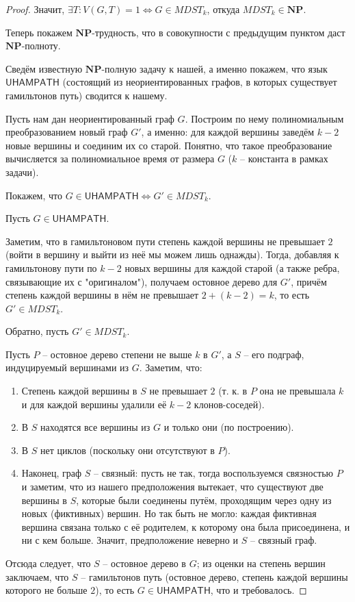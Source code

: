 \documentclass[a4paper,11pt]{article}
\theoremstyle{plain}
\theoremstyle{definition}
\theoremstyle{remark}
\begin{document}
\begin{proof}
Значит, $\exists T: V(G, T) = 1 \Leftrightarrow G \in MDST_k$, откуда $MDST_k \in \mathbf{NP}$.

Теперь покажем $\mathbf{NP}$-трудность, что в совокупности с предыдущим пунктом даст $\mathbf{NP}$-полноту.

Сведём известную $\mathbf{NP}$-полную задачу к нашей, а именно покажем, что язык $\mathsf{UHAMPATH}$ (состоящий из неориентированных графов, в которых существует гамильтонов путь) сводится к нашему.

Пусть нам дан неориентированный граф $G$. Построим по нему полиномиальным преобразованием новый граф $G'$, а именно: для каждой вершины заведём $k-2$ новые вершины и соединим их со старой. Понятно, что такое преобразование вычисляется за полиномиальное время от размера $G$ ($k$ -- константа в рамках задачи).

Покажем, что $G \in \mathsf{UHAMPATH} \Leftrightarrow G' \in MDST_k$.

Пусть $G \in \mathsf{UHAMPATH}$.

Заметим, что в гамильтоновом пути степень каждой вершины не превышает $2$ (войти в вершину и выйти из неё мы можем лишь однажды). Тогда, добавляя к гамильтонову пути по $k-2$ новых вершины для каждой старой (а также ребра, связывающие их с "оригиналом"), получаем остовное дерево для $G'$, причём степень каждой вершины в нём не превышает $2 + (k-2) = k$, то есть $G' \in MDST_k$.

Обратно, пусть $G' \in MDST_k$.

Пусть $P$ -- остовное дерево степени не выше $k$ в $G'$, а $S$ -- его подграф, индуцируемый вершинами из $G$. Заметим, что:

\begin{enumerate}
  \item Степень каждой вершины в $S$ не превышает $2$ (т. к. в $P$ она не превышала $k$ и для каждой вершины удалили её $k-2$ клонов-соседей).
  \item В $S$ находятся все вершины из $G$ и только они (по построению).
  \item В $S$ нет циклов (поскольку они отсутствуют в $P$).
  \item Наконец, граф $S$ -- связный: пусть не так, тогда воспользуемся связностью $P$ и заметим, что из нашего предположения вытекает, что существуют две вершины в $S$, которые были соединены путём, проходящим через одну из новых (фиктивных) вершин. Но так быть не могло: каждая фиктивная вершина связана только с её родителем, к которому она была присоединена, и ни с кем больше. Значит, предположение неверно и $S$ -- связный граф.
\end{enumerate}

Отсюда следует, что $S$ -- остовное дерево в $G$; из оценки на степень вершин заключаем, что $S$ -- гамильтонов путь (остовное дерево, степень каждой вершины которого не больше $2$), то есть $G \in \mathsf{UHAMPATH}$, что и требовалось.

\end{proof}
\end{document}
